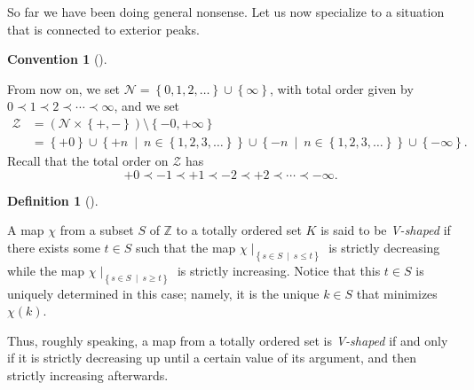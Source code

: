 \documentclass[numbers=enddot,12pt,final,onecolumn,notitlepage]{scrartcl}%
\theoremstyle{definition}
\newtheorem{defi}[theo]{Definition}
\newenvironment{definition}[1][]
{\begin{defi}[#1]\begin{leftbar}}
{\end{leftbar}\end{defi}}
\newtheorem{conv}[theo]{Convention}
\newenvironment{convention}[1][]
{\begin{conv}[#1]\begin{leftbar}}
{\end{leftbar}\end{conv}}
\newenvironment{convention}[1][Convention]{\noindent\textbf{#1.} }{\ \rule{0.5em}{0.5em}}
\begin{document}
So far we have been doing general nonsense. Let us now specialize to a
situation that is connected to exterior peaks.

\begin{convention}
From now on, we set $\mathcal{N}=\left\{  0,1,2,\ldots\right\}  \cup\left\{
\infty\right\}  $, with total order given by $0\prec1\prec2\prec\cdots
\prec\infty$, and we set
\begin{align*}
\mathcal{Z}  &  =\left(  \mathcal{N}\times\left\{  +,-\right\}  \right)
\setminus\left\{  -0,+\infty\right\} \\
&  =\left\{  +0\right\}  \cup\left\{  +n\ \mid\ n\in\left\{  1,2,3,\ldots
\right\}  \right\}  \cup\left\{  -n\ \mid\ n\in\left\{  1,2,3,\ldots\right\}
\right\}  \cup\left\{  -\infty\right\}  .
\end{align*}
Recall that the total order on $\mathcal{Z}$ has%
\[
+0\prec-1\prec+1\prec-2\prec+2\prec\cdots\prec-\infty.
\]

\end{convention}

\begin{definition}
A map $\chi$ from a subset $S$ of $\mathbb{Z}$ to a totally ordered set $K$ is
said to be \textit{V-shaped} if there exists some $t\in S$ such that the map
$\chi\mid_{\left\{  s\in S\ \mid\ s\leq t\right\}  }$ is strictly decreasing
while the map $\chi\mid_{\left\{  s\in S\ \mid\ s\geq t\right\}  }$ is
strictly increasing. Notice that this $t\in S$ is uniquely determined in this
case; namely, it is the unique $k\in S$ that minimizes $\chi\left(  k\right)
$.
\end{definition}

Thus, roughly speaking, a map from a totally ordered set is \textit{V-shaped}
if and only if it is strictly decreasing up until a certain value of its
argument, and then strictly increasing afterwards.
\end{document}

